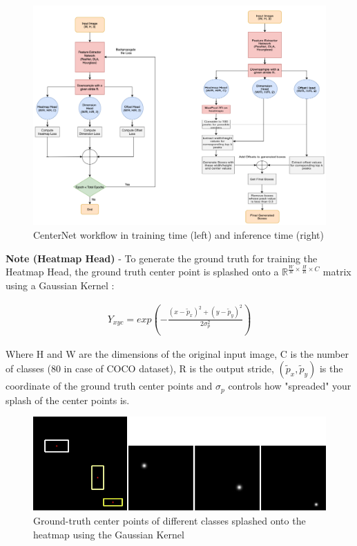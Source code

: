 \documentclass[12pt]{article}
\begin{document}
\begin{figure}[H]
    \centering
    \captionsetup{justification=centering}
    \includegraphics[scale=0.35]{./images/CenterNet_flow.png}
    \caption{CenterNet workflow in training time (left) and inference time (right)}
\end{figure}



\textbf{Note (Heatmap Head)} - To generate the ground truth for training the Heatmap Head, the ground truth center point is splashed onto a $\mathbb{R}^{\frac{W}{R}\times\frac{H}{R}\times C}$ matrix using a Gaussian Kernel :

\begin{align}
    Y_{xyc}=exp(-\frac{(x- \tilde p_x)^2 + (y - \tilde p_y)^2}{2\sigma_p^2})
\end{align}

Where H and W are the dimensions of the original input image, C is the number of classes (80 in case of COCO dataset), R is the output stride, $(\tilde p_x, \tilde p_y)$ is the coordinate of the ground truth center points and $\sigma_p$ controls how "spreaded" your splash of the center points is. 

\begin{figure}[H]
    \centering
    \captionsetup{justification=centering}
    \includegraphics[scale=0.35]{./images/splash.png}
    \caption{Ground-truth center points of different classes splashed onto the heatmap using the Gaussian Kernel}
\end{figure}
\end{document}
